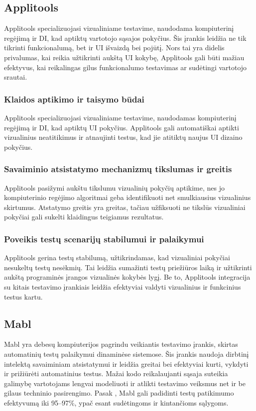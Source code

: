 \documentclass[
]{VUMIFPSkursinis}
\begin{document}
\subsection{Applitools}

Applitools specializuojasi vizualiniame testavime, naudodama kompiuterinį regėjimą ir DI, kad aptiktų vartotojo sąsajos pokyčius. Šis įrankis leidžia ne tik tikrinti funkcionalumą, bet ir UI išvaizdą bei pojūtį. Nors tai yra didelis privalumas, kai reikia užtikrinti aukštą UI kokybę, Applitools gali būti mažiau efektyvus, kai reikalingas gilus funkcionalumo testavimas ar sudėtingi vartotojo srautai. \cite{Appitools}

\subsubsection{Klaidos aptikimo ir taisymo būdai}

Applitools specializuojasi vizualiniame testavime, naudodamas kompiuterinį regėjimą ir DI, kad aptiktų UI pokyčius. Applitools gali automatiškai aptikti vizualinius neatitikimus ir atnaujinti testus, kad jie atitiktų naujus UI dizaino pokyčius.

\subsubsection{Savaiminio atsistatymo mechanizmų tikslumas ir greitis}

Applitools pasižymi aukštu tikslumu vizualinių pokyčių aptikime, nes jo kompiuterinio regėjimo algoritmai geba identifikuoti net smulkiausius vizualinius skirtumus. Atstatymo greitis yra greitas, tačiau užfiksuoti ne tikslūs vizualiniai pokyčiai gali sukelti klaidingus teigiamus rezultatus.

\subsubsection{Poveikis testų scenarijų stabilumui ir palaikymui}

Applitools gerina testų stabilumą, užtikrindamas, kad vizualiniai pokyčiai nesukeltų testų nesėkmių. Tai leidžia sumažinti testų priežiūros laiką ir užtikrinti aukštą programinės įrangos vizualinės kokybės lygį. Be to, Applitools integracija su kitais testavimo įrankiais leidžia efektyviai valdyti vizualinius ir funkcinius testus kartu.

\subsection{Mabl}
Mabl yra debesų kompiuterijos pagrindu veikiantis testavimo įrankis, skirtas automatinių testų palaikymui dinaminėse sistemose. Šis įrankis naudoja dirbtinį intelektą savaiminiam atsistatymui ir leidžia greitai bei efektyviai kurti, vykdyti ir prižiūrėti automatinius testus. Mažai kodo reikalaujanti sąsaja suteikia galimybę vartotojams lengvai modeliuoti ir atlikti testavimo veiksmus net ir be gilaus techninio pasirengimo. Pasak \cite{Garousi2024}, Mabl gali padidinti testų patikimumo efektyvumą iki 95–97\%, ypač esant sudėtingoms ir kintančioms sąlygoms.
\end{document}
